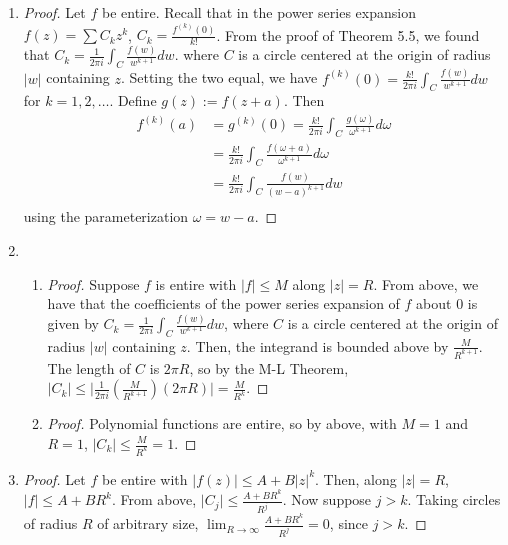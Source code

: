 \documentclass[11pt, letterpaper]{article}
\begin{document}
\begin{enumerate}
  \item \begin{proof}
    Let $f$ be entire. Recall that in the power series expansion $f(z) = \sum C_k z^k$, $C_k = \frac{f^{(k)}(0)}{k!}$. From the proof of Theorem 5.5, we found that $C_k = \frac{1}{2\pi i} \int_C \frac{f(w)}{w^{k + 1}} dw$. where $C$ is a circle centered at the origin of radius $\vert w \vert$ containing $z$. Setting the two equal, we have $f^{(k)}(0) = \frac{k!}{2\pi i} \int_C \frac{f(w)}{w^{k + 1}} dw$ for $k = 1, 2, \dots$. Define $g(z) := f(z + a)$. Then 
    \begin{align*}
      f^{(k)}(a) &= g^{(k)}(0) = \frac{k!}{2\pi i} \int_C \frac{g(\omega)}{\omega^{k + 1}} d\omega \\
      &= \frac{k!}{2\pi i} \int_C \frac{f(\omega + a)}{\omega^{k + 1}} d\omega \\
      &= \frac{k!}{2\pi i} \int_C \frac{f(w)}{(w - a)^{k + 1}} dw \\
    \end{align*}
    using the parameterization $\omega = w - a$.
  \end{proof}

  \item \begin{enumerate}
    \item \begin{proof}
      Suppose $f$ is entire with $\vert f \vert \leq M$ along $\vert z \vert = R$. From above, we have that the coefficients of the power series expansion of $f$ about 0 is given by $C_k = \frac{1}{2 \pi i} \int_C \frac{f(w)}{w^{k + 1}} dw$, where $C$ is a circle centered at the origin of radius $\vert w \vert$ containing $z$. Then, the integrand is bounded above by $\frac{M}{R^{k + 1}}$. The length of $C$ is $2\pi R$, so by the M-L Theorem, $\vert C_k \vert \leq \vert \frac{1}{2\pi i} \left(\frac{M}{R^{k + 1}}\right)(2 \pi R) \vert = \frac{M}{R^k}$.
    \end{proof}

    \item \begin{proof}
      Polynomial functions are entire, so by above, with $M = 1$ and $R = 1$, $\vert C_k \vert \leq \frac{M}{R^k} = 1$.
    \end{proof}
  \end{enumerate}

  \item \begin{proof}
    Let $f$ be entire with $\vert f(z) \vert \leq A + B \vert z \vert^k$. Then, along $\vert z \vert = R$, $\vert f \vert \leq A + BR^k$. From above, $\vert C_j \vert \leq \frac{A + BR^k}{R^j}$. Now suppose $j > k$. Taking circles of radius $R$ of arbitrary size, $\lim_{R \to \infty} \frac{A + BR^k}{R^j} = 0$, since $j > k$.
  \end{proof}


\end{enumerate}
\end{document}
